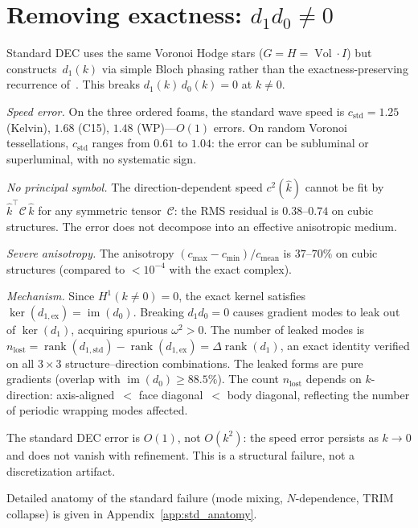 \documentclass[preprint,12pt]{elsarticle}
\DeclareMathOperator{\Vol}{Vol}
\DeclareMathOperator{\rank}{rank}
\DeclareMathOperator{\im}{im}
\begin{document}
\section{Removing exactness: $d_1 d_0 \neq 0$}
\label{sec:exactness}

Standard DEC uses the same Voronoi Hodge stars ($G = H = \Vol \cdot I$)
but constructs~$d_1(k)$ via simple Bloch phasing rather than the
exactness-preserving recurrence of~\cite{paper1}. This breaks
$d_1(k)\, d_0(k) = 0$ at $k \neq 0$.

\emph{Speed error.}
On the three ordered foams, the standard wave speed is
$c_{\mathrm{std}} = 1.25$ (Kelvin), $1.68$ (C15), $1.48$ (WP)---$O(1)$
errors. On random Voronoi tessellations, $c_{\mathrm{std}}$ ranges from
$0.61$ to $1.04$: the error can be subluminal or superluminal, with no
systematic sign.

\emph{No principal symbol.}
The direction-dependent speed $c^2(\hat{k})$ cannot be fit by
$\hat{k}^\top \mathcal{C}\, \hat{k}$ for any symmetric tensor~$\mathcal{C}$:
the RMS residual is $0.38$--$0.74$ on cubic structures. The error does
not decompose into an effective anisotropic medium.

\emph{Severe anisotropy.}
The anisotropy $(c_{\max} - c_{\min})/c_{\mathrm{mean}}$ is $37$--$70\%$
on cubic structures (compared to $< 10^{-4}$ with the exact complex).

\emph{Mechanism.}
Since $H^1(k \neq 0) = 0$, the exact kernel satisfies
$\ker(d_{1,\mathrm{ex}}) = \im(d_0)$. Breaking $d_1 d_0 = 0$ causes
gradient modes to leak out of $\ker(d_1)$, acquiring spurious
$\omega^2 > 0$. The number of leaked modes is
$n_{\mathrm{lost}} = \rank(d_{1,\mathrm{std}}) - \rank(d_{1,\mathrm{ex}})
= \Delta\rank(d_1)$,
an exact identity verified on all $3 \times 3$ structure--direction
combinations. The leaked forms are pure gradients (overlap with
$\im(d_0) \geq 88.5\%$). The count $n_{\mathrm{lost}}$ depends on
$k$-direction: axis-aligned~$< $ face diagonal~$<$ body diagonal, reflecting
the number of periodic wrapping modes affected.

The standard DEC error is $O(1)$, not $O(k^2)$: the speed error persists
as $k \to 0$ and does not vanish with refinement. This is a structural
failure, not a discretization artifact.

Detailed anatomy of the standard failure (mode mixing, $N$-dependence,
TRIM collapse) is given in Appendix~\ref{app:std_anatomy}.
\end{document}
